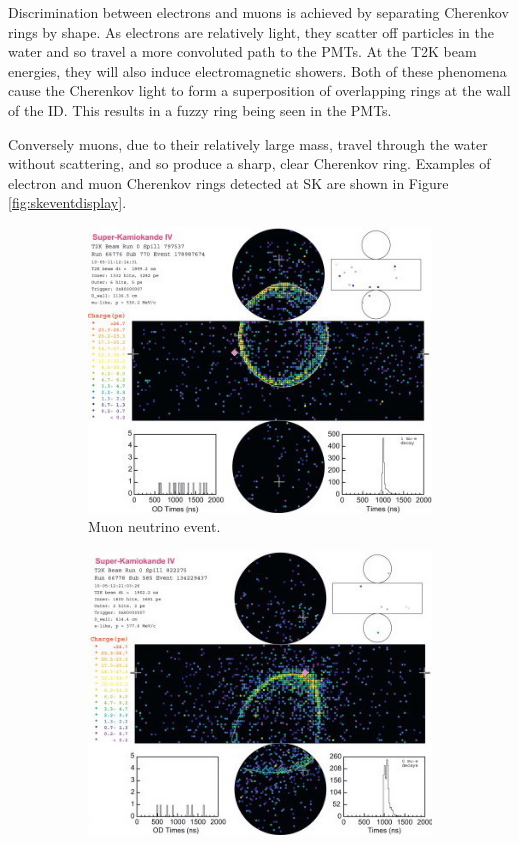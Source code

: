 Discrimination between electrons and muons is achieved by separating Cherenkov rings by shape. As electrons are relatively light, they scatter off particles in the water and so travel a more convoluted path to the PMTs. At the T2K beam energies, they will also induce electromagnetic showers. Both of these phenomena cause the Cherenkov light to form a superposition of overlapping rings at the wall of the ID. This results in a fuzzy ring being seen in the PMTs.

Conversely muons, due to their relatively large mass, travel through the water without scattering, and so produce a sharp, clear Cherenkov ring. Examples of electron and muon Cherenkov rings detected at SK are shown in Figure \ref{fig:skeventdisplay}.

\begin{figure}
\centering
\begin{subfigure}{.5\textwidth}
  \centering
  \includegraphics[width=0.95\linewidth]{figs/skeventdisplayelectron}
  \caption{Muon neutrino event.}
  \label{fig:skeventdisplayelectron}
\end{subfigure}%
\begin{subfigure}{.5\textwidth}
  \centering
  \includegraphics[width=0.95\linewidth]{figs/skeventdisplaymuon}

\end{subfigure}
\end{figure}
